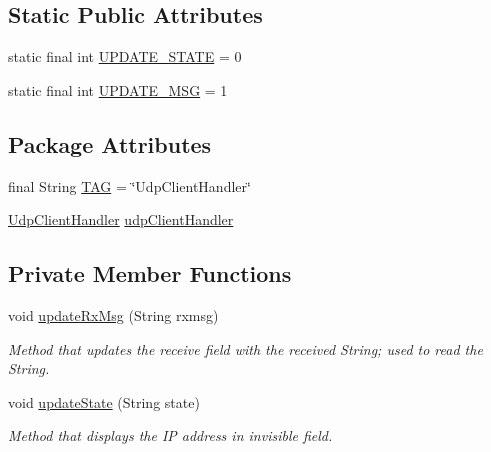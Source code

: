 \subsection*{Static Public Attributes}
\begin{DoxyCompactItemize}
\item 
static final int \mbox{\hyperlink{classcom_1_1example_1_1trainawearapplication_1_1_udp_client_handler_abb97ab46d1d8c23159f9ea1319425a5c}{U\+P\+D\+A\+T\+E\+\_\+\+S\+T\+A\+TE}} = 0
\item 
static final int \mbox{\hyperlink{classcom_1_1example_1_1trainawearapplication_1_1_udp_client_handler_ae0a5ca10db5db46916ca3a3acb7416b8}{U\+P\+D\+A\+T\+E\+\_\+\+M\+SG}} = 1
\end{DoxyCompactItemize}
\subsection*{Package Attributes}
\begin{DoxyCompactItemize}
\item 
final String \mbox{\hyperlink{classcom_1_1example_1_1trainawearapplication_1_1_udp_client_handler_a0d2c877a919491f82a2d6f473111a104}{T\+AG}} = \char`\"{}Udp\+Client\+Handler\char`\"{}
\item 
\mbox{\hyperlink{classcom_1_1example_1_1trainawearapplication_1_1_udp_client_handler}{Udp\+Client\+Handler}} \mbox{\hyperlink{classcom_1_1example_1_1trainawearapplication_1_1_udp_client_handler_a8a26005b219cfd9a5a80382882fae5a3}{udp\+Client\+Handler}}
\end{DoxyCompactItemize}
\subsection*{Private Member Functions}
\begin{DoxyCompactItemize}
\item 
void \mbox{\hyperlink{classcom_1_1example_1_1trainawearapplication_1_1_udp_client_handler_a8fa21c06cef3adafc938dc19ecc232ab}{update\+Rx\+Msg}} (String rxmsg)
\begin{DoxyCompactList}\small\item\em Method that updates the receive field with the received String; used to read the String. \end{DoxyCompactList}\item 
void \mbox{\hyperlink{classcom_1_1example_1_1trainawearapplication_1_1_udp_client_handler_a65fd50027c6302d5c8d858e844fc3e6f}{update\+State}} (String state)
\begin{DoxyCompactList}\small\item\em Method that displays the IP address in invisible field. \end{DoxyCompactList}\end{DoxyCompactItemize}
